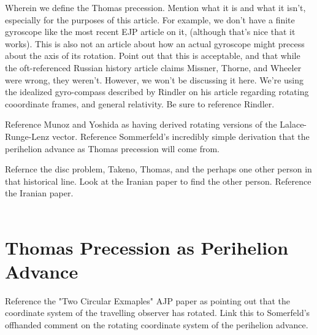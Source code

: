 \documentclass[prb,preprint]{revtex4-1}
\begin{document}
Wherein we define the Thomas precession.  Mention what it is and what it isn't, especially for the purposes of this article.  For example, we don't have a finite gyroscope like the most recent EJP article on it, (although that's nice that it works).  This is also not an article about how an actual gyroscope might precess about the axis of its rotation.  Point out that this is acceptable, and that while the oft-referenced Russian history article claims Missner, Thorne, and Wheeler were wrong, they weren't.  However, we won't be discussing it here.  We're using the idealized gyro-compass described by Rindler on his article regarding rotating cooordinate frames, and general relativity.  Be sure to reference Rindler.

Reference Munoz and Yoshida as having derived rotating versions of the Lalace-Runge-Lenz vector.  Reference Sommerfeld's incredibly simple derivation that the perihelion advance as Thomas precession will come from.  

Refernce the disc problem, Takeno, Thomas, and the perhaps one other person in that historical line.  Look at the Iranian paper to find the other person.  Reference the Iranian paper.
\\
\\
\section{Thomas Precession as Perihelion Advance}
Reference the "Two Circular Exmaples" AJP paper as pointing out that the coordinate system of the travelling observer has rotated.  Link this to Somerfeld's offhanded comment on the rotating coordinate system of the perihelion advance.
\\
\\
\\\\\\
\end{document}
